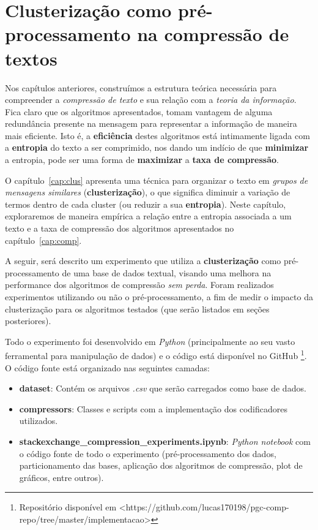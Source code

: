 
\chapter{Clusterização como pré-processamento na compressão de textos}
Nos capítulos anteriores, construímos a estrutura teórica necessária para compreender a \emph{compressão de texto} e sua relação com a \emph{teoria da informação}.
Fica claro que os algoritmos apresentados, tomam vantagem de alguma redundância presente na mensagem para representar a informação de maneira mais eficiente.
Isto é, a \textbf{eficiência} destes algoritmos está intimamente ligada com a \textbf{entropia} do texto a ser comprimido,
 nos dando um indício de que \textbf{minimizar} a entropia, pode ser uma forma de \textbf{maximizar} a \textbf{taxa de compressão}.
 
O capítulo~\ref{cap:clus} apresenta uma técnica para organizar o texto em \emph{grupos de mensagens similares} (\textbf{clusterização}), o que significa diminuir a variação de termos dentro de cada cluster (ou reduzir a sua \textbf{entropia}).
Neste capítulo, exploraremos de maneira empírica a relação entre a entropia associada a um texto e a taxa de compressão dos algoritmos apresentados no capítulo~\ref{cap:comp}.

A seguir, será descrito um experimento que utiliza a \textbf{clusterização} como pré-processamento de uma base de dados textual, visando uma melhora na performance dos algoritmos de compressão \emph{sem perda}.
Foram realizados experimentos utilizando ou não o pré-processamento, a fim de medir o impacto da clusterização para os algoritmos testados (que serão listados em seções posteriores).

Todo o experimento foi desenvolvido em \emph{Python} (principalmente ao seu vasto ferramental para manipulação de dados) e o código está disponível no GitHub \footnote{Repositório disponível em <https://github.com/lucas170198/pgc-comp-repo/tree/master/implementacao>}.
O código fonte está organizado nas seguintes camadas:
\begin{itemize}
	\item \textbf{dataset}: Contém os arquivos \emph{.csv} que serão carregados como base de dados.
	\item \textbf{compressors}: Classes e scripts com a implementação dos codificadores utilizados.
	\item \textbf{stackexchange\_compression\_experiments.ipynb}: \emph{Python notebook} com o código fonte de todo o experimento (pré-processamento dos dados, particionamento das bases, aplicação dos algoritmos de compressão, plot de gráficos, entre outros).
\end{itemize}
\pagebreak

